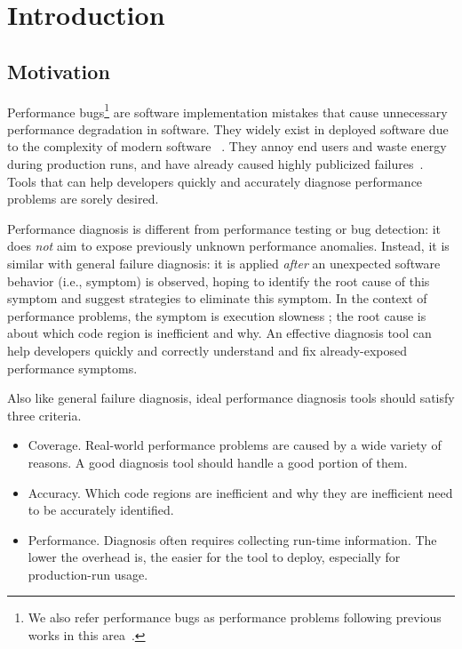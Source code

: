 \section{Introduction}
\label{sec:intro}
\subsection{Motivation}

Performance bugs\footnote{We also refer performance bugs as performance problems
following previous works in this area~\cite{PerfBug,Alabama,SongOOPSLA2014}.} 
are software implementation mistakes that cause unnecessary performance
degradation in software. They widely exist in deployed software due to the 
complexity of modern software
~\cite{PerfBug,perf.fse10,rily.perftest,perfantipattern,xiao13:context}. 
They annoy end users and waste energy during production runs, and 
have already caused highly publicized failures~\cite{ACA-health,colorado}.
Tools that can help
developers quickly and accurately diagnose performance problems
are sorely desired.

Performance diagnosis is different from performance testing or
bug detection: it does \textit{not} aim to expose previously unknown performance
anomalies. 
Instead, it is similar with general failure diagnosis: 
it is applied \textit{after} an unexpected software behavior (i.e., symptom)
is observed, hoping to identify the root cause of this symptom and suggest
strategies to eliminate this symptom.
In the context of performance problems, the symptom is execution 
slowness \cite{SongOOPSLA2014}; the root cause is about
which code region is inefficient and why.
An effective diagnosis tool can help developers quickly and correctly understand 
and fix already-exposed performance symptoms.


Also like general failure diagnosis, ideal performance diagnosis tools should
satisfy three criteria.
\begin{itemize}
\item Coverage. 
Real-world performance problems are caused by a wide variety of reasons.
A good diagnosis tool should handle a good portion of them.

\item Accuracy. 
Which code regions are inefficient and why they are inefficient
need to be accurately identified.

\item Performance. 
Diagnosis often requires collecting run-time information. The lower the overhead
is, the easier for the tool to deploy, especially for 
production-run usage. 
\end{itemize}

